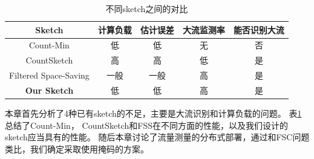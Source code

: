 \begin{table}[ht]
	\centering
	\begin{tabular}{c|c|c|c|c}
		\hline
		Sketch & 计算负载 &估计误差&大流监测率& 能否识别大流 \\
		\hline
		Count-Min\cite{cormode2004improved} & 低 &低& 无 &否\\
		\hline
		CountSketch\cite{charikar2004finding} & 高 &高 &低&是\\
		\hline
		Filtered Space-Saving\cite{homem2010finding}  & 一般 & 一般&高& 是\\
		\hline
		\textbf{Our Sketch} & 低 &低 &高&是\\
		\hline		
	\end{tabular}
	\caption{不同sketch之间的对比}\label{tbl:sketchcompare}
\end{table}
本章首先分析了4种已有sketch的不足，主要是大流识别和计算负载的问题。
表\ref{tbl:sketchcompare}总结了Count-Min， CountSketch和FSS在不同方面的性能，以及我们设计的sketch应当具有的性能。
随后本章讨论了流量测量的分布式部署，通过和FSC问题类比，我们确定采取使用掩码的方案。
